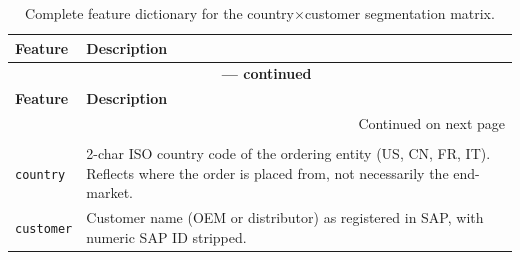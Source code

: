 \documentclass{article}
\begin{document}
\renewcommand{\arraystretch}{1.15}
\begin{longtable}{@{}p{5.4cm} p{10.6cm}@{}}
\caption{Complete feature dictionary for the country$\times$customer segmentation matrix.}
\label{tab:feature_dict_segmentation} \\
\toprule
\textbf{Feature} & \textbf{Description} \\
\midrule
\endfirsthead
\multicolumn{2}{c}{{\bfseries \tablename\ \thetable{} --- continued}} \\
\toprule
\textbf{Feature} & \textbf{Description} \\
\midrule
\endhead
\midrule
\multicolumn{2}{r}{{Continued on next page}} \\
\endfoot
\bottomrule
\endlastfoot

\rowcolor{gray!20} \multicolumn{2}{@{}l}{\textit{Identifiers}} \\
\texttt{country} & 2-char ISO country code of the ordering entity (US, CN, FR, IT). Reflects where the order is placed from, not necessarily the end-market. \\
\texttt{customer} & Customer name (OEM or distributor) as registered in SAP, with numeric SAP ID stripped. \\


\end{longtable}
\end{document}
